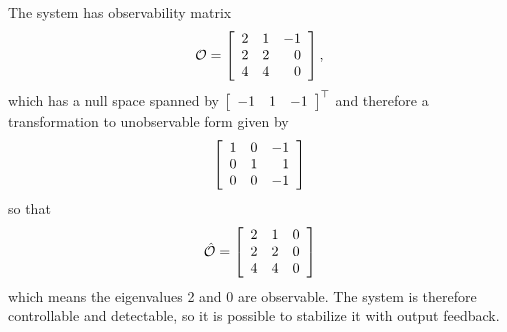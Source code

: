 \documentclass{article}
\begin{document}
\begin{enumerate}[(a)]
{%
The system has observability matrix
$$
\mathcal{O} =
\left[\begin{array}{r r r}
  2 & 1 & -1 \\
  2 & 2 &  0 \\
  4 & 4 &  0
\end{array}\right],
$$
which has a null space spanned by
$
\left[\begin{array}{r r r}
  -1 & 1 & -1
\end{array}\right]^\top
$
and therefore a transformation to unobservable form given by
$$
\left[\begin{array}{r r r}
  1 & 0 & -1 \\
  0 & 1 &  1 \\
  0 & 0 & -1
\end{array}\right]
$$
so that
$$
\hat{\mathcal{O}} =
\left[\begin{array}{r r r}
  2 & 1 & 0 \\
  2 & 2 & 0 \\
  4 & 4 & 0
\end{array}\right]
$$
which means the eigenvalues 2 and 0 are observable. The system is
therefore controllable and detectable, so it is possible to stabilize
it with output feedback.
}
\end{enumerate}
\end{document}
